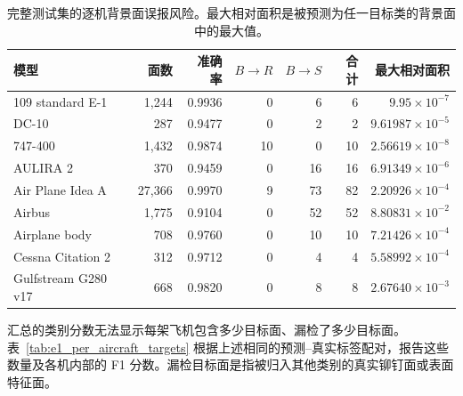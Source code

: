 \documentclass[12pt,a4paper]{ctexart}
\begin{document}
\begin{table}[!ht]
\centering
\small
\caption{完整测试集的逐机背景面误报风险。最大相对面积是被预测为任一目标类的背景面中的最大值。}\label{tab:e1_risk}
\begin{tabular}{lrrrrrr}
\toprule
模型 & 面数 & 准确率 & $B\rightarrow R$ & $B\rightarrow S$ & 合计 & 最大相对面积 \\
\midrule
109 standard E-1 & 1,244 & 0.9936 & 0 & 6 & 6 & $9.95\times10^{-7}$ \\
DC-10 & 287 & 0.9477 & 0 & 2 & 2 & $9.61987\times10^{-5}$ \\
747-400 & 1,432 & 0.9874 & 10 & 0 & 10 & $2.56619\times10^{-8}$ \\
AULIRA 2 & 370 & 0.9459 & 0 & 16 & 16 & $6.91349\times10^{-6}$ \\
Air Plane Idea A & 27,366 & 0.9970 & 9 & 73 & 82 & $2.20926\times10^{-4}$ \\
Airbus & 1,775 & 0.9104 & 0 & 52 & 52 & $8.80831\times10^{-2}$ \\
Airplane body & 708 & 0.9760 & 0 & 10 & 10 & $7.21426\times10^{-4}$ \\
Cessna Citation 2 & 312 & 0.9712 & 0 & 4 & 4 & $5.58992\times10^{-4}$ \\
Gulfstream G280 v17 & 668 & 0.9820 & 0 & 8 & 8 & $2.67640\times10^{-3}$ \\
\bottomrule
\end{tabular}
\end{table}

汇总的类别分数无法显示每架飞机包含多少目标面、漏检了多少目标面。表~\ref{tab:e1_per_aircraft_targets} 根据上述相同的预测--真实标签配对，报告这些数量及各机内部的 F1 分数。漏检目标面是指被归入其他类别的真实铆钉面或表面特征面。
\end{document}
